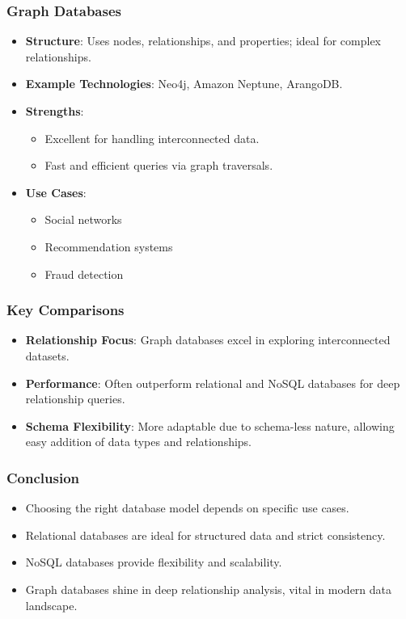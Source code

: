 \documentclass[aspectratio=169]{beamer}
\begin{document}
\begin{frame}[fragile]
    \frametitle{Graph Databases}
    \begin{itemize}
        \item \textbf{Structure}: Uses nodes, relationships, and properties; ideal for complex relationships.
        \item \textbf{Example Technologies}: Neo4j, Amazon Neptune, ArangoDB.
        \item \textbf{Strengths}:
        \begin{itemize}
            \item Excellent for handling interconnected data.
            \item Fast and efficient queries via graph traversals.
        \end{itemize}
        \item \textbf{Use Cases}:
        \begin{itemize}
            \item Social networks
            \item Recommendation systems
            \item Fraud detection
        \end{itemize}
    \end{itemize}
\end{frame}

\begin{frame}[fragile]
    \frametitle{Key Comparisons}
    \begin{itemize}
        \item \textbf{Relationship Focus}: Graph databases excel in exploring interconnected datasets.
        \item \textbf{Performance}: Often outperform relational and NoSQL databases for deep relationship queries.
        \item \textbf{Schema Flexibility}: More adaptable due to schema-less nature, allowing easy addition of data types and relationships.
    \end{itemize}
\end{frame}

\begin{frame}[fragile]
    \frametitle{Conclusion}
    \begin{itemize}
        \item Choosing the right database model depends on specific use cases.
        \item Relational databases are ideal for structured data and strict consistency.
        \item NoSQL databases provide flexibility and scalability.
        \item Graph databases shine in deep relationship analysis, vital in modern data landscape.
    \end{itemize}
\end{frame}
\end{document}
